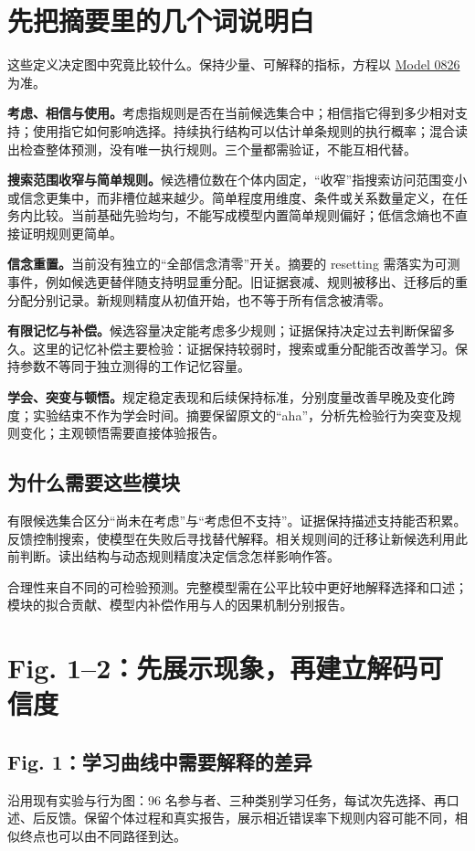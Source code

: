 \documentclass[12pt]{article}
\newcommand{\idea}[2]{\par\Needspace{3\baselineskip}\noindent\textbf{#1。}#2\par}
\begin{document}
\section{先把摘要里的几个词说明白}
这些定义决定图中究竟比较什么。保持少量、可解释的指标，方程以 \href{model_0826.pdf}{Model 0826} 为准。

\idea{考虑、相信与使用}{考虑指规则是否在当前候选集合中；相信指它得到多少相对支持；使用指它如何影响选择。持续执行结构可以估计单条规则的执行概率；混合读出检查整体预测，没有唯一执行规则。三个量都需验证，不能互相代替。}
\idea{搜索范围收窄与简单规则}{候选槽位数在个体内固定，“收窄”指搜索访问范围变小或信念更集中，而非槽位越来越少。简单程度用维度、条件或关系数量定义，在任务内比较。当前基础先验均匀，不能写成模型内置简单规则偏好；低信念熵也不直接证明规则更简单。}
\idea{信念重置}{当前没有独立的“全部信念清零”开关。摘要的 resetting 需落实为可测事件，例如候选更替伴随支持明显重分配。旧证据衰减、规则被移出、迁移后的重分配分别记录。新规则精度从初值开始，也不等于所有信念被清零。}
\idea{有限记忆与补偿}{候选容量决定能考虑多少规则；证据保持决定过去判断保留多久。这里的记忆补偿主要检验：证据保持较弱时，搜索或重分配能否改善学习。保持参数不等同于独立测得的工作记忆容量。}
\idea{学会、突变与顿悟}{规定稳定表现和后续保持标准，分别度量改善早晚及变化跨度；实验结束不作为学会时间。摘要保留原文的“aha”，分析先检验行为突变及规则变化；主观顿悟需要直接体验报告。}

\subsection{为什么需要这些模块}
有限候选集合区分“尚未在考虑”与“考虑但不支持”。证据保持描述支持能否积累。反馈控制搜索，使模型在失败后寻找替代解释。相关规则间的迁移让新候选利用此前判断。读出结构与动态规则精度决定信念怎样影响作答。

合理性来自不同的可检验预测。完整模型需在公平比较中更好地解释选择和口述；模块的拟合贡献、模型内补偿作用与人的因果机制分别报告。

\section{Fig. 1--2：先展示现象，再建立解码可信度}
\subsection{Fig. 1：学习曲线中需要解释的差异}
沿用现有实验与行为图：96 名参与者、三种类别学习任务，每试次先选择、再口述、后反馈。保留个体过程和真实报告，展示相近错误率下规则内容可能不同，相似终点也可以由不同路径到达。
\end{document}
